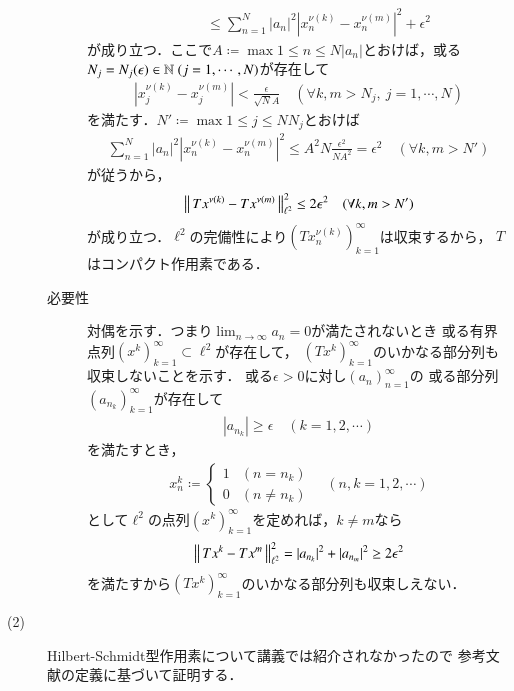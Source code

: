 \begin{prf}
\begin{description}
\begin{description}
\begin{align}
							&\qquad \leq \sum_{n=1}^{N} |a_n|^2 \left|x_n^{\nu(k)} - x_n^{\nu(m)} \right|^2 + \epsilon^2
						\end{align}
						が成り立つ．ここで$A \coloneqq \max{1 \leq n \leq N}{|a_n|}$とおけば，或る$N_j = N_j(\epsilon) \in \N\ (j=1,\cdots,N)$が存在して
						\begin{align}
							\left|x_j^{\nu(k)} - x_j^{\nu(m)} \right| < \frac{\epsilon}{\sqrt{N} A}
							\quad (\forall k,m > N_j,\ j=1,\cdots,N)
						\end{align}
						を満たす．$N' \coloneqq \max{1 \leq j \leq N}{N_j}$とおけば
						\begin{align}
							\sum_{n=1}^{N} |a_n|^2 \left|x_n^{\nu(k)} - x_n^{\nu(m)} \right|^2
							\leq A^2 N \frac{\epsilon^2}{N A^2} = \epsilon^2
							\quad (\forall k,m > N')
						\end{align}
						が従うから，
						\begin{align}
							\left\|\, T x^{\nu(k)} - T x^{\nu(m)}\, \right\|_{\ell^2}^2 \leq 2 \epsilon^2 \quad (\forall k,m > N')
						\end{align}
						が成り立つ．$\ell^2$の完備性により$\left(T x_n^{\nu(k)} \right)_{k=1}^{\infty}$は収束するから，
						$T$はコンパクト作用素である．
						
					\item[必要性]
						対偶を示す．つまり$\lim_{n \to \infty} a_n = 0$が満たされないとき
						或る有界点列$(x^k)_{k=1}^{\infty} \subset \ell^2$が存在して，
						$(T x^k)_{k=1}^{\infty}$のいかなる部分列も収束しないことを示す．
						或る$\epsilon > 0$に対し$(a_n)_{n=1}^{\infty}$の
						或る部分列$\left(a_{n_k}\right)_{k=1}^{\infty}$が存在して
						\begin{align}
							\left| a_{n_k} \right| \geq \epsilon
							\quad (k=1,2,\cdots)
						\end{align}
						を満たすとき，
						\begin{align}
							x^k_n \coloneqq
							\begin{cases}
								1 & (n=n_k) \\
								0 & (n \neq n_k)
							\end{cases}
							\quad (n,k=1,2,\cdots)
						\end{align}
						として$\ell^2$の点列$(x^k)_{k=1}^{\infty}$を定めれば，$k \neq m$なら
						\begin{align}
							\left\|\, T x^k - T x^m\, \right\|_{\ell^2}^2
							= |a_{n_k}|^2 + |a_{n_m}|^2
							\geq 2 \epsilon^2
						\end{align}
						を満たすから$(T x^k)_{k=1}^{\infty}$のいかなる部分列も収束しえない．
				\end{description}
			\item[(2)]
				Hilbert-Schmidt型作用素について講義では紹介されなかったので
				参考文献\cite{key1}の定義に基づいて証明する．
				

\end{description}
\end{prf}
